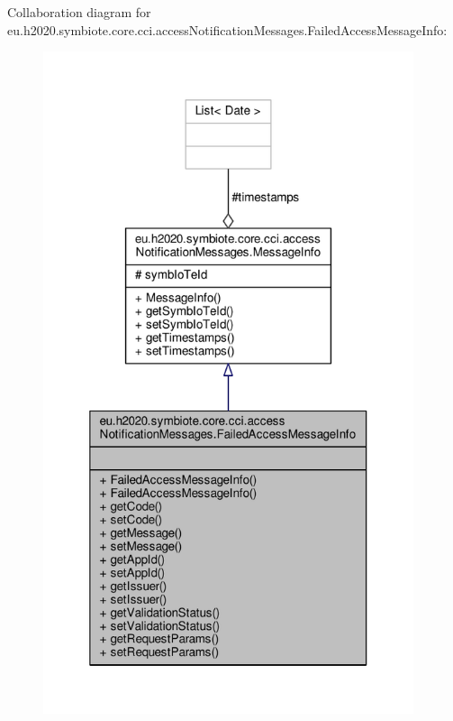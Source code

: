 Collaboration diagram for eu.\+h2020.\+symbiote.\+core.\+cci.\+access\+Notification\+Messages.\+Failed\+Access\+Message\+Info\+:\nopagebreak
\begin{figure}[H]
\begin{center}
\leavevmode
\includegraphics[width=308pt]{classeu_1_1h2020_1_1symbiote_1_1core_1_1cci_1_1accessNotificationMessages_1_1FailedAccessMessageInfo__coll__graph}
\end{center}
\end{figure}
